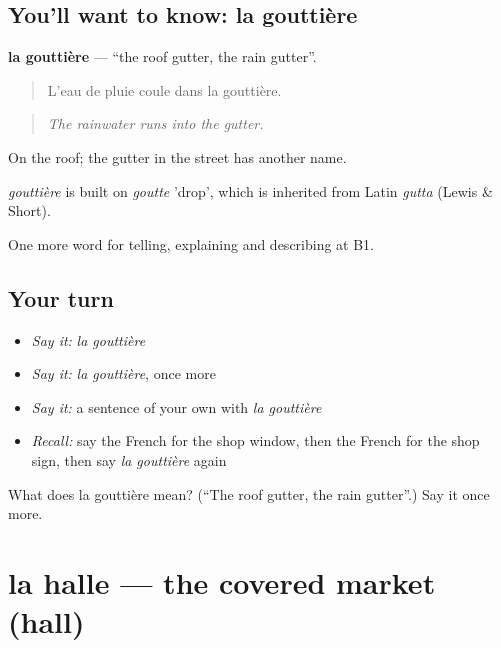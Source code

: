 \subsection*{You'll want to know: la gouttière}
\textbf{la gouttière} — \textquotedblleft{}the roof gutter, the rain gutter\textquotedblright{}.

\begin{quote}
L'eau de pluie coule dans la gouttière.
\end{quote}

\begin{quote}
\emph{The rainwater runs into the gutter.}
\end{quote}

On the roof; the gutter in the street has another name.

\begin{cousinweb}
\emph{gouttière} is built on \emph{goutte} 'drop', which is inherited from Latin \emph{gutta} (Lewis \& Short).
\end{cousinweb}

\begin{grammarlens}[title={What you've built}]
One more word for telling, explaining and describing at B1.
\end{grammarlens}

\subsection*{Your turn}
\begin{itemize}
\raggedright
  \item \emph{Say it:} \emph{la gouttière}
  \item \emph{Say it:} \emph{la gouttière}, once more
  \item \emph{Say it:} a sentence of your own with \emph{la gouttière}
  \item \emph{Recall:} say the French for the shop window, then the French for the shop sign, then say \emph{la gouttière} again
\end{itemize}

\begin{tcolorbox}[breakable,colback=teal!4,colframe=teal!35!black,title={Before you move on}]
What does la gouttière mean? (\textquotedblleft{}The roof gutter, the rain gutter\textquotedblright{}.) Say it once more.
\end{tcolorbox}
\section[la halle]{la halle — the covered market (hall)}

